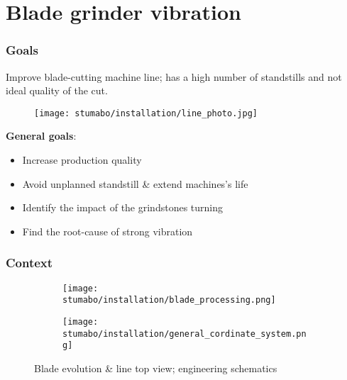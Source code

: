 \section{Blade grinder vibration}
\SectionPage

\begin{frame}
    \frametitle{Goals}
    \vspace*{\fill}
    Improve blade-cutting machine line; has a high number of standstills and not ideal quality of the cut.
    \begin{figure}[ht]
        \texttt{[image: stumabo/installation/line\_photo.jpg]}
    \end{figure}
    \textbf{General goals}:
    \begin{itemize}
        \item Increase production quality
        \item Avoid unplanned standstill \& extend machines's life
        \item Identify the impact of the grindstones turning
        \item Find the root-cause of strong vibration
    \end{itemize}

    \vspace*{\fill}
\end{frame}

\begin{frame}
    \frametitle{Context}
    \begin{figure}[ht]
        \begin{subfigure}{\textwidth}
            \centering
            \texttt{[image: stumabo/installation/blade\_processing.png]}
        \end{subfigure}
        \begin{subfigure}{\textwidth}
            \centering
            \texttt{[image: stumabo/installation/general\_cordinate\_system.png]}
        \end{subfigure}
        \caption{Blade evolution \& line top view; engineering schematics}
    \end{figure}
\end{frame}

